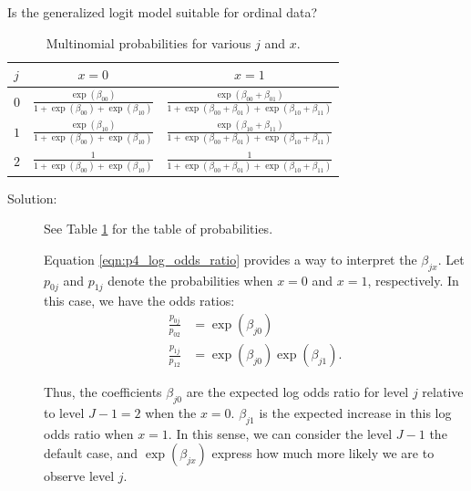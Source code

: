 \documentclass[letterpaper,11pt]{article}
\begin{document}
\begin{enumerate}
  Is the generalized logit model suitable for ordinal data?

  \begin{table}[h]
    \small
    \centering
    \begin{tabular}{lcc}    
      \toprule
      $j$ & $x = 0$ & $x = 1$ \\
      \midrule
      $0$ & $\displaystyle\frac{\exp\left(\beta_{00}\right)}{1 + \exp\left(\beta_{00}\right) + \exp\left(\beta_{10}\right)}$ & $\displaystyle\frac{\exp\left(\beta_{00} + \beta_{01}\right)}{1 + \exp\left(\beta_{00} + \beta_{01}\right) + \exp\left(\beta_{10} + \beta_{11}\right)}$ \\
      $1$ & $\displaystyle\frac{\exp\left(\beta_{10}\right)}{1 + \exp\left(\beta_{00}\right) + \exp\left(\beta_{10}\right)}$ & $\displaystyle\frac{\exp\left(\beta_{10} + \beta_{11}\right)}{1 + \exp\left(\beta_{00} + \beta_{01}\right) + \exp\left(\beta_{10} + \beta_{11}\right)}$ \\
      $2$ & $\displaystyle\frac{1}{1 + \exp\left(\beta_{00}\right) + \exp\left(\beta_{10}\right)}$ & $\displaystyle\frac{1}{1 + \exp\left(\beta_{00} + \beta_{01}\right) + \exp\left(\beta_{10} + \beta_{11}\right)}$ \\
      \bottomrule
    \end{tabular}
    \caption{Multinomial probabilities for various $j$ and $x$.}
    \label{tab:p4_multinomial_probability}
  \end{table}

  \begin{description}
  \item[Solution:] See Table \ref{tab:p4_multinomial_probability} for the table
    of probabilities.

    Equation \ref{eqn:p4_log_odds_ratio} provides a way to interpret the
    $\beta_{jx}$. Let $p_{0j}$ and $p_{1j}$ denote the probabilities when
    $x = 0$ and $x = 1$, respectively. In this case, we have the odds ratios:
    \begin{align*}
      \frac{p_{0j}}{p_{02}} &= \exp\left(\beta_{j0}\right) \\
      \frac{p_{1j}}{p_{12}} &= \exp\left(\beta_{j0}\right)\exp\left(\beta_{j1}\right).
    \end{align*}

    Thus, the coefficients $\beta_{j0}$ are the expected log odds ratio for
    level $j$ relative to level $J - 1 = 2$ when the $x = 0$. $\beta_{j1}$ is
    the expected increase in this log odds ratio when $x = 1$. In this sense, we
    can consider the level $J - 1$ the default case, and
    $\exp\left(\beta_{jx}\right)$ express how much more likely we are to observe
    level $j$.


\end{description}
\end{enumerate}
\end{document}
